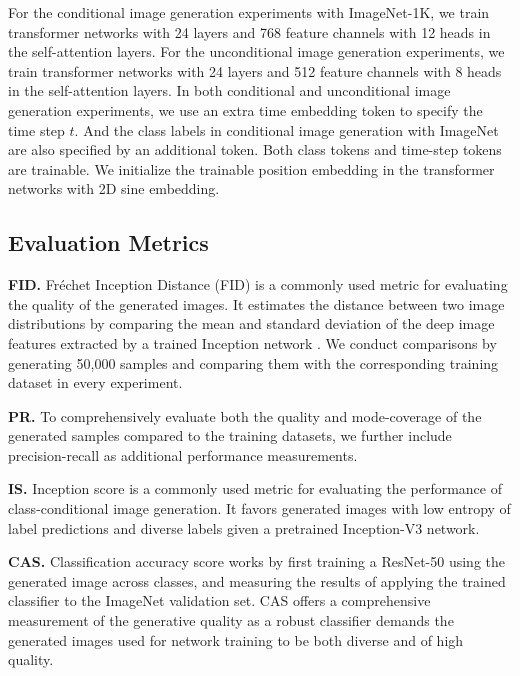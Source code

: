 \documentclass[10pt,twocolumn,letterpaper]{article}
\begin{document}
For the conditional image generation experiments with ImageNet-1K, we train transformer networks with 24 layers and 768 feature channels with 12 heads in the self-attention layers. 
For the unconditional image generation experiments, we train transformer networks with 24 layers and 512 feature channels with 8 heads
in the self-attention layers. 
In both conditional and unconditional image generation experiments, we use an extra time embedding token to specify the time step $t$. And the class labels in conditional image generation with ImageNet are also specified by an additional token. Both class tokens and time-step tokens are trainable. 
We initialize the trainable position embedding in the transformer networks with 2D sine embedding. 



\subsection{Evaluation Metrics}


\noindent \textbf{FID.} Fr\'echet Inception Distance (FID) is a commonly used metric for evaluating the quality of the generated images. It estimates the distance between two image distributions by comparing the mean and standard deviation of the deep image features extracted by a trained Inception network \cite{inception}.
We conduct comparisons by generating 50,000 samples and comparing them with the corresponding training dataset in every experiment.

\noindent \textbf{PR.} To comprehensively evaluate both the quality and mode-coverage of the generated samples compared to the training datasets, we further include precision-recall \cite{pr} as additional performance measurements.

\noindent \textbf{IS.} Inception score \cite{salimans2016improved} is a commonly used metric for evaluating the performance of class-conditional image generation. It favors generated images with low entropy of label predictions and diverse labels given a pretrained Inception-V3 network. 

\noindent \textbf{CAS.} Classification accuracy score \cite{cas} works by first training a ResNet-50 \cite{resnet} using the generated image across classes, and measuring the results of applying the trained classifier to the ImageNet validation set. CAS offers a comprehensive measurement of the generative quality as a robust classifier demands the generated images used for network training to be both diverse and of high quality. 
\end{document}
